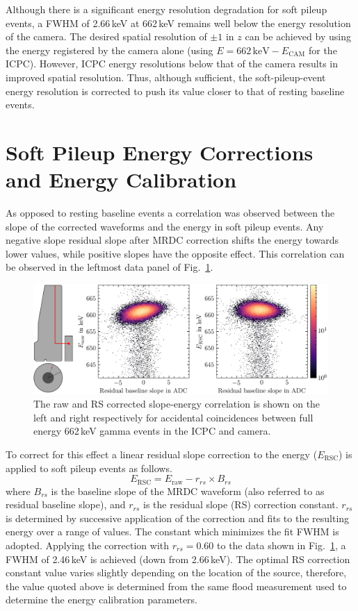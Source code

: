 Although there is a significant energy resolution degradation for soft pileup events, a FWHM of 2.66\,keV at 662\,keV remains well below the energy resolution of the camera. The desired spatial resolution of $\pm1$ in $z$ can be achieved by using the energy registered by the camera alone (using $E = 662\,\text{keV} - E_\text{CAM}$ for the ICPC). However, ICPC energy resolutions below that of the camera results in improved spatial resolution. Thus, although sufficient, the soft-pileup-event energy resolution is corrected to push its value closer to that of resting baseline events. 

\section{Soft Pileup Energy Corrections and Energy Calibration}\label{sec:ecorrcal}

As opposed to resting baseline events a correlation was observed between the slope of the corrected waveforms and the energy in soft pileup events. Any negative slope residual slope after MRDC correction shifts the energy towards lower values, while positive slopes have the opposite effect. This correlation can be observed in the leftmost data panel of Fig.~\ref{fig:soft_pileup_e_corr}.
\begin{figure}[htb]
    \centering
    \includegraphics[width=6in]{figs/param/soft_pileup_e_corr.png}
    \caption{The raw and RS corrected slope-energy correlation is shown on the left and right respectively for accidental coincidences between full energy 662\,keV gamma events in the ICPC and camera.}
    \label{fig:soft_pileup_e_corr}
\end{figure}

To correct for this effect a linear residual slope correction to the energy ($E_\text{RSC}$) is applied to soft pileup events as follows.
\begin{equation}
	E_\text{RSC} = E_\text{raw} - r_{rs} \times B_{rs}
\end{equation}
where $B_{rs}$ is the baseline slope of the MRDC waveform (also referred to as residual baseline slope), and $r_{rs}$ is the residual slope (RS) correction constant. $r_{rs}$ is determined by successive application of the correction and fits to the resulting energy over a range of values. The constant which minimizes the fit FWHM is adopted. Applying the correction with $r_{rs} = 0.60$ to the data shown in Fig.~\ref{fig:soft_pileup_e_corr}, a FWHM of 2.46\,keV is achieved (down from 2.66\,keV). The optimal RS correction constant value varies slightly depending on the location of the source, therefore, the value quoted above is determined from the same flood \ThS{} measurement used to determine the energy calibration parameters.

